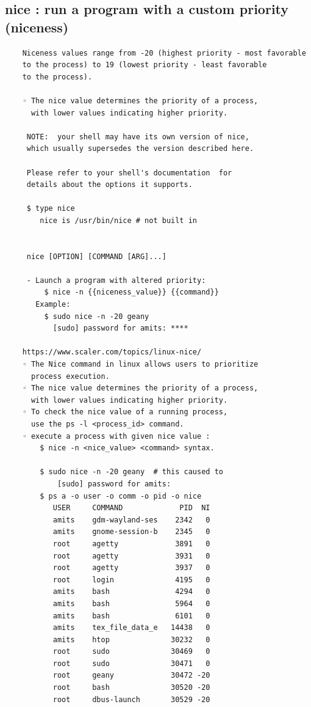 \documentclass[a4paper,12pt]{article}
\begin{document}
\subsection{nice    : run a program with a custom priority (niceness) }
\begin{verbatim}
    Niceness values range from -20 (highest priority - most favorable
    to the process) to 19 (lowest priority - least favorable
    to the process).

    ◦ The nice value determines the priority of a process, 
      with lower values indicating higher priority.
    
     NOTE:  your shell may have its own version of nice, 
     which usually supersedes the version described here.
     
     Please refer to your shell's documentation  for
     details about the options it supports.
     
     $ type nice
        nice is /usr/bin/nice # not built in
     
     
     nice [OPTION] [COMMAND [ARG]...]

     - Launch a program with altered priority:
         $ nice -n {{niceness_value}} {{command}}
       Example: 
         $ sudo nice -n -20 geany
           [sudo] password for amits: **** 
 
    https://www.scaler.com/topics/linux-nice/
    ◦ The Nice command in linux allows users to prioritize
      process execution.
    ◦ The nice value determines the priority of a process, 
      with lower values indicating higher priority.
    ◦ To check the nice value of a running process, 
      use the ps -l <process_id> command.
    ◦ execute a process with given nice value : 
        $ nice -n <nice_value> <command> syntax.  

        $ sudo nice -n -20 geany  # this caused to 
            [sudo] password for amits: 
        $ ps a -o user -o comm -o pid -o nice    
           USER     COMMAND             PID  NI
           amits    gdm-wayland-ses    2342   0
           amits    gnome-session-b    2345   0
           root     agetty             3891   0
           root     agetty             3931   0
           root     agetty             3937   0
           root     login              4195   0
           amits    bash               4294   0
           amits    bash               5964   0
           amits    bash               6101   0
           amits    tex_file_data_e   14438   0
           amits    htop              30232   0
           root     sudo              30469   0
           root     sudo              30471   0
           root     geany             30472 -20
           root     bash              30520 -20
           root     dbus-launch       30529 -20
\end{verbatim}
\end{document}
